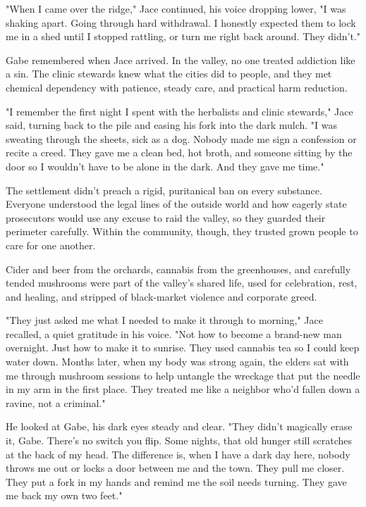 "When I came over the ridge," Jace continued, his voice dropping lower, "I was shaking apart. Going through hard withdrawal. I honestly expected them to lock me in a shed until I stopped rattling, or turn me right back around. They didn't."

Gabe remembered when Jace arrived. In the valley, no one treated addiction like a sin. The clinic stewards knew what the cities did to people, and they met chemical dependency with patience, steady care, and practical harm reduction.

"I remember the first night I spent with the herbalists and clinic stewards," Jace said, turning back to the pile and easing his fork into the dark mulch. "I was sweating through the sheets, sick as a dog. Nobody made me sign a confession or recite a creed. They gave me a clean bed, hot broth, and someone sitting by the door so I wouldn't have to be alone in the dark. And they gave me time."

The settlement didn't preach a rigid, puritanical ban on every substance. Everyone understood the legal lines of the outside world and how eagerly state prosecutors would use any excuse to raid the valley, so they guarded their perimeter carefully. Within the community, though, they trusted grown people to care for one another. 

Cider and beer from the orchards, cannabis from the greenhouses, and carefully tended mushrooms were part of the valley's shared life, used for celebration, rest, and healing, and stripped of black-market violence and corporate greed. 

"They just asked me what I needed to make it through to morning," Jace recalled, a quiet gratitude in his voice. "Not how to become a brand-new man overnight. Just how to make it to sunrise. They used cannabis tea so I could keep water down. Months later, when my body was strong again, the elders sat with me through mushroom sessions to help untangle the wreckage that put the needle in my arm in the first place. They treated me like a neighbor who'd fallen down a ravine, not a criminal."

He looked at Gabe, his dark eyes steady and clear. "They didn't magically erase it, Gabe. There's no switch you flip. Some nights, that old hunger still scratches at the back of my head. The difference is, when I have a dark day here, nobody throws me out or locks a door between me and the town. They pull me closer. They put a fork in my hands and remind me the soil needs turning. They gave me back my own two feet."

